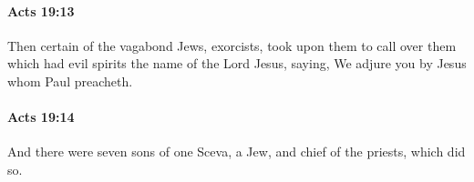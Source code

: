 		\paragraph{Acts 19:13} %
			\label{ACTS-19-13}

			Then certain of the vagabond Jews, exorcists, took upon them to call over them which had evil spirits the name of the Lord Jesus, saying, We adjure you by Jesus whom Paul preacheth.

			\begin{framed}
			\scriptsize
				\begin{compactdesc}
					\item[SBLG] 
				\end{compactdesc}
			\end{framed}

		\paragraph{Acts 19:14} %
			\label{ACTS-19-14}

			And there were seven sons of one Sceva, a Jew, and chief of the priests, which did so.

